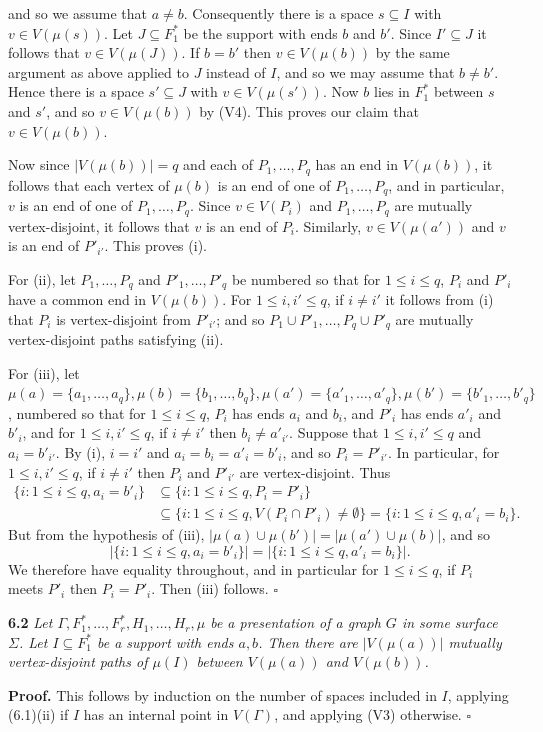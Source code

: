 \noindent and so we assume that $a \ne b$. Consequently there is a space $s \subseteq I$ with $v \in V(\mu(s))$. Let $J \subseteq F_1^*$ be the support with ends $b$ and $b'$. Since $I' \subseteq J$ it follows that $v \in V(\mu(J))$. If $b = b'$ then $v \in V(\mu(b))$ by the same argument as above applied to $J$ instead of $I$, and so we may assume that $b \ne b'$. Hence there is a space $s' \subseteq J$ with $v \in V(\mu(s'))$. Now $b$ lies in $F_1^*$ between $s$ and $s'$, and so $v \in V(\mu(b))$ by (V4). This proves our claim that $v \in V(\mu(b))$.

Now since $|V(\mu(b))| = q$ and each of $P_1, \ldots, P_q$ has an end in $V(\mu(b))$, it follows that each vertex of $\mu(b)$ is an end of one of $P_1, \ldots, P_q$, and in particular, $v$ is an end of one of $P_1, \ldots, P_q$. Since $v \in V(P_i)$ and $P_1, \ldots, P_q$ are mutually vertex-disjoint, it follows that $v$ is an end of $P_i$. Similarly, $v \in V(\mu(a'))$ and $v$ is an end of $P'_{i'}$. This proves (i).

For (ii), let $P_1, \ldots, P_q$ and $P'_1, \ldots, P'_q$ be numbered so that for $1 \le i \le q$, $P_i$ and $P'_i$ have a common end in $V(\mu(b))$. For $1 \le i, i' \le q$, if $i \ne i'$ it follows from (i) that $P_i$ is vertex-disjoint from $P'_{i'}$; and so $P_1 \cup P'_1, \ldots, P_q \cup P'_q$ are mutually vertex-disjoint paths satisfying (ii).

For (iii), let $\mu(a) = \{a_1, \ldots, a_q\}, \mu(b) = \{b_1, \ldots, b_q\}, \mu(a') = \{a'_1, \ldots, a'_q\}, \mu(b') = \{b'_1, \ldots, b'_q\}$, numbered so that for $1 \le i \le q$, $P_i$ has ends $a_i$ and $b_i$, and $P'_i$ has ends $a'_i$ and $b'_i$, and for $1 \le i, i' \le q$, if $i \ne i'$ then $b_i \ne a'_{i'}$. Suppose that $1 \le i, i' \le q$ and $a_i = b'_{i'}$. By (i), $i = i'$ and $a_i = b_i = a'_i = b'_i$, and so $P_i = P'_{i'}$. In particular, for $1 \le i, i' \le q$, if $i \ne i'$ then $P_i$ and $P'_{i'}$ are vertex-disjoint. Thus
\begin{align*}
\{i : 1 \le i \le q, a_i = b'_i\} &\subseteq \{i : 1 \le i \le q, P_i = P'_i\} \\
&\subseteq \{i : 1 \le i \le q, V(P_i \cap P'_i) \ne \emptyset\} = \{i : 1 \le i \le q, a'_i = b_i\}.
\end{align*}
But from the hypothesis of (iii), $|\mu(a) \cup \mu(b')| = |\mu(a') \cup \mu(b)|$, and so
\begin{equation*}
|\{i : 1 \le i \le q, a_i = b'_i\}| = |\{i : 1 \le i \le q, a'_i = b_i\}|.
\end{equation*}
We therefore have equality throughout, and in particular for $1 \le i \le q$, if $P_i$ meets $P'_i$ then $P_i = P'_i$. Then (iii) follows. $\square$

\textbf{6.2} \textit{Let $\Gamma, F_1^*, \ldots, F_r^*, H_1, \ldots, H_r, \mu$ be a presentation of a graph $G$ in some surface $\Sigma$. Let $I \subseteq F_1^*$ be a support with ends $a, b$. Then there are $|V(\mu(a))|$ mutually vertex-disjoint paths of $\mu(I)$ between $V(\mu(a))$ and $V(\mu(b))$.}

\textbf{Proof.} This follows by induction on the number of spaces included in $I$, applying (6.1)(ii) if $I$ has an internal point in $V(\Gamma)$, and applying (V3) otherwise. $\square$
